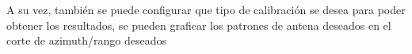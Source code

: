 A su vez, también se puede configurar que tipo de calibración se desea para poder obtener los resultados, se pueden graficar 
los patrones de antena deseados en el corte de azimuth/rango deseados 
\begin{comment}
\section{Modelo de control}
El diseño fue abordado de manera que a partir de la medición de corriente entregada a la carga se obtenga la referencia de tensión usando el
modelo de tensión de la pila de combustible. A su vez, esta referencia se utilizará como \emph{set-point} del PI de tensión implementado
anteriormente para el convertidor reductor. Por otra parte el modelo del convertidor reductor ha sido modificado levemente permitiéndole
conducir en sentido opuesto a corrientes de carga muy bajas y posibilitar así su funcionamiento permanente en modo de conducción continua, incluso
a corrientes de carga muy bajas. Esto es posible gracias a que las llaves de conmutación utilizadas son bidireccionales. Operar el convertidor
en modo de conducción continua permite mejorar la resolución del emulador a bajas corrientes.

El esquema del modelo de simulación general es el de la figura \ref{fig:esquema_control}.

\begin{figure}[H]
  \centering
  \texttt{[image: gfx/esquema\_control.eps]}
  \caption{Esquema general de control}
  \label{fig:esquema_control}
\end{figure}

\subsection{Filtro de corriente}
Conforme a la estructura presentada en la fig. \ref{fig:esquema_control} y guardando cierta analogía con del diseño el modelo de control utilizado para el
elevador (fig. \ref{fig:modelo_elevador}), nuevamente se hace necesario el uso de un filtro de corriente que rechace las componentes de frecuencia generadas
por el PWM.

Para el modelo del emulador, sin embargo, la utilización del filtro de corriente cumple una función adicional además del rechazo del rizado producido por
la operación natural del sistema de potencia. En la sec. \ref{sub:sintonia_elevador} se mencionó la necesidad de diferenciar los comportamientos dinámicos
de los diferentes lazos de realimentación con el fin de que las aproximaciones utilizadas para adaptar el esquema de control basado en controladores lineales
sea efectiva. Para aquel caso, fue necesario que la inclusión de los controladores PI permitiera corregir el error de seguimiento a la referencia y distinguir
la velocidad en que ambos lazos operaban, considerando que el lazo de corriente es más rápido. Para el modelo del emulador se ha intercambiado el orden de los
lazos de control. Esto implica una complicación ya que hay que modificar la dinámica del lazo de corriente de modo que sea haga más lento que el de tensión.


\end{comment}
